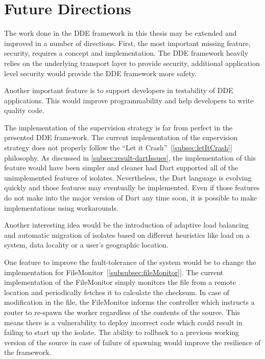 \chapter{Future Directions}\label{chapter:future_directions}

  The work done in the DDE framework in this thesis may be extended and improved in a number of directions. First, the most important missing feature, security, requires a concept and implementation. The DDE framework heavily relies on the underlying transport layer to provide security, additional application level security would provide the DDE framework more safety.

  Another important feature is to support developers in testability of DDE applications. This would improve programmability and help developers to write quality code.

  The implementation of the supervision strategy is far from perfect in the presented DDE framework. The current implementation of the supervision strategy does not properly follow the “Let it Crash”~[\autoref{subsec:letItCrash}] philosophy. As discussed in \autoref{subsec:result-dartIssues}, the implementation of this feature would have been simpler and cleaner had Dart supported all of the unimplemented features of isolates. Nevertheless, the Dart language is evolving quickly and those features may eventually be implemented. Even if those features do not make into the major version of Dart any time soon, it is possible to make implementations using workarounds.

  Another interesting idea would be the introduction of adaptive load balancing and automatic migration of isolates based on different heuristics like load on a system, data locality or a user's geographic location.

  One feature to improve the fault-tolerance of the system would be to change the implementation for FileMonitor~[\autoref{subsubsec:fileMonitor}]. The current implementation of the FileMonitor simply monitors the file from a remote location and periodically fetches it to calculate the checksum. In case of modification in the file, the FileMonitor informs the controller which instructs a router to re-spawn the worker regardless of the contents of the source. This means there is a vulnerability to deploy incorrect code which could result in failing to start up the isolate. The ability to rollback to a previous working version of the source in case of failure of spawning would improve the resilience of the framework.


